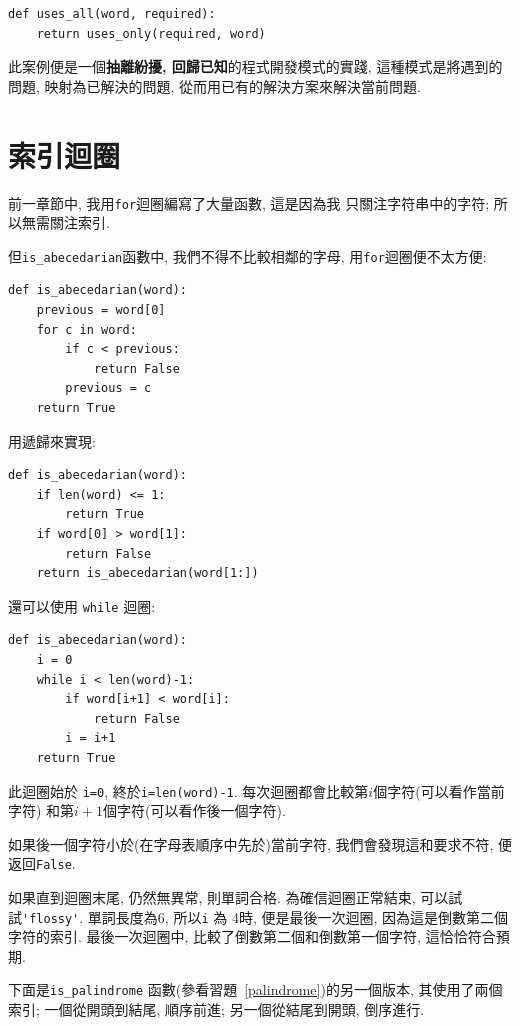 \documentclass[10pt]{book}
\begin{document}
\begin{verbatim}
def uses_all(word, required):
    return uses_only(required, word)
\end{verbatim}
%
此案例便是一個{\bf 抽離紛擾, 回歸已知}的程式開發模式的實踐, 
這種模式是將遇到的問題, 映射為已解決的問題, 
從而用已有的解決方案來解決當前問題.   


\section{索引迴圈}
前一章節中, 我用{\tt for}迴圈編寫了大量函數, 這是因為我
只關注字符串中的字符; 所以無需關注索引. 

但\verb"is_abecedarian"函數中, 我們不得不比較相鄰的字母, 
用{\tt for}迴圈便不太方便:

\begin{verbatim}
def is_abecedarian(word):
    previous = word[0]
    for c in word:
        if c < previous:
            return False
        previous = c
    return True
\end{verbatim}

用遞歸來實現:

\begin{verbatim}
def is_abecedarian(word):
    if len(word) <= 1:
        return True
    if word[0] > word[1]:
        return False
    return is_abecedarian(word[1:])
\end{verbatim}

還可以使用 {\tt while} 迴圈:

\begin{verbatim}
def is_abecedarian(word):
    i = 0
    while i < len(word)-1:
        if word[i+1] < word[i]:
            return False
        i = i+1
    return True
\end{verbatim}
%
此迴圈始於 {\tt i=0}, 終於{\tt i=len(word)-1}. 
每次迴圈都會比較第$i$個字符(可以看作當前字符)
和第$i+1$個字符(可以看作後一個字符). 

如果後一個字符小於(在字母表順序中先於)當前字符, 
我們會發現這和要求不符, 便返回{\tt False}.

如果直到迴圈末尾, 仍然無異常, 則單詞合格. 
為確信迴圈正常結束, 可以試試\verb"'flossy'". 
單詞長度為6, 所以{\tt i} 為 4時, 便是最後一次迴圈, 
因為這是倒數第二個字符的索引. 最後一次迴圈中, 
比較了倒數第二個和倒數第一個字符, 這恰恰符合預期. 

下面是\verb"is_palindrome" 函數(參看習題~\ref{palindrome})的另一個版本, 
其使用了兩個索引; 一個從開頭到結尾, 順序前進;
另一個從結尾到開頭, 倒序進行.
\end{document}
